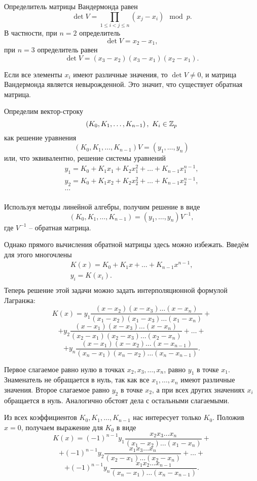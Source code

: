 Определитель матрицы Вандермонда равен
    \[ \det V = \prod_{1\le i < j\le n} \left(x_j - x_i \right) \mod p. \]
В частности, при $n=2$ определитель
    \[ \det V = x_2 - x_1, \]
при $n=3$ определитель равен
    \[ \det V = (x_3 - x_2) (x_3 - x_1) (x_2 - x_1). \]

Если все элементы $x_{i}$ имеют различные значения, то $\det V \ne 0$, и матрица Вандермонда является невырожденной. Это значит, что существует обратная матрица.

Определим вектор-строку
    \[ \left(K_{0}, K_{1},  \ldots,  K_{n-1}\right), ~ K_{i} \in \mathbb{Z}_{p} \]
как решение уравнения
    \[ (K_{0} ,K_{1} ,  \ldots, K{}_{n-1} )V=(y_{1} ,  \ldots, y_{n} ) \]
или, что эквивалентно, решение системы уравнений
\[ \begin{array}{l}
    y_1 = K_0 + K_1 x_1 + K_2 x_1^2 + \dots + K_{n-1} x_1^{n-1}, \\
    y_2 = K_0 + K_1 x_2 + K_2 x_2^2 + \dots + K_{n-1} x_2^{n-1}, \\
    \dots \\
\end{array} \]

Используя методы линейной алгебры, получим решение в виде
    \[ (K_{0} ,K_{1} ,  \ldots,  K_{n-1} )=(y_{1} ,  \ldots,  y_{n} )V^{-1}, \]
где $V^{-1}$ -- обратная матрица.

Однако прямого вычисления обратной матрицы здесь можно избежать. Введём для этого многочлены
\[ \begin{array}{c}
    K(x)= K_{0} +K_{1} x+ \ldots +K_{n-1} x^{n-1}, \\
    y_{i} =K(x_{i}). \\
\end{array} \]
Теперь решение этой задачи можно задать интерполяционной формулой Лагранжа:
\[
    K(x) = y_1 \frac{(x - x_2)(x - x_3) \dots (x - x_n)} {(x_1-x_2)(x_1-x_3) \dots (x_1-x_n)} +
\] \[
    + y_2 \frac{(x-x_1)(x-x_3) \dots (x-x_n)} {(x_2-x_1)(x_2-x_3) \dots (x_2-x_n)} + \dots +
\] \[
    + y_n \frac{(x-x_1)(x-x_2) \dots (x-x_{n-1})} {(x_n-x_1)(x_n-x_2) \dots (x_n-x_{n-1})}.
\]

Первое слагаемое равно нулю в точках $x_2, x_3, \dots, x_n$,   равно $y_1$ в точке $x_1$. Знаменатель не обращается в нуль, так как все $x_1, \dots, x_n$ имеют различные значения. Второе слагаемое равно $y_2$ в точке $x_2$, а при всех других значениях $x_i$ обращается в нуль. Аналогично обстоят дела с остальными слагаемыми.

Из всех коэффициентов $K_0, K_1, \dots, K_{n-1}$ нас интересует только $K_0$.
Положив $x=0$, получаем выражение для $K_{0} $ в виде
\[
    K(x) = (-1)^{n-1} y_1 \frac{x_2 x_3 \dots x_n} {(x_1-x_2) \dots (x_1-x_n)} +
\] \[
    + (-1)^{n-1} y_2 \frac{x_1 x_3 \dots x_n} {(x_2-x_1) \dots (x_2-x_n)} + \dots +
\] \[
    + (-1)^{n-1} y_n \frac{x_1 x_2 \dots x_{n-1}} {(x_n-x_1) \dots (x_n-x_{n-1})}.
\]

